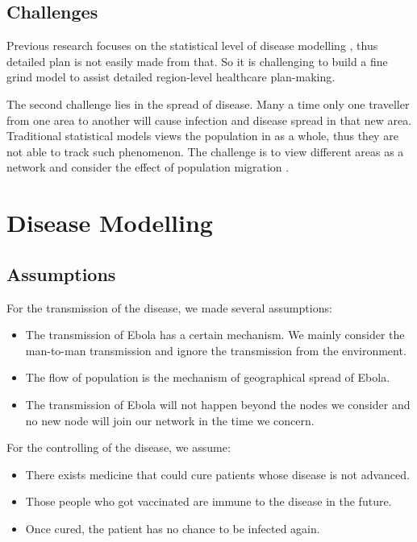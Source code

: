 \documentclass[11pt]{article}
\begin{document}
\subsection{Challenges}

Previous research focuses on the statistical level of disease modelling\cite{anderson1992infectious}\cite{lekone2006statistical}\cite{ivorra2014codis}\cite{team2014ebola}\cite{chowell2014transmission}   , thus detailed plan is not easily made from that. So it is challenging to build a fine grind model to assist detailed region-level healthcare plan-making.

The second challenge lies in the spread of disease. Many a time only one traveller from one area to another will cause infection and disease spread in that new area. Traditional statistical models views the population in as a whole, thus they are not able to track such phenomenon. The challenge is to view different areas as a network and consider the effect of population migration\cite{basharpredicting} .


\section{Disease Modelling}
\label{dmodel}
\subsection{Assumptions}

For the transmission of the disease, we made several assumptions:

\begin{itemize}

\item The transmission of Ebola has a certain mechanism. We mainly consider the man-to-man transmission and ignore the transmission from the environment.

\item The flow of population is the mechanism of geographical spread of Ebola.

\item The transmission of Ebola will not happen beyond the nodes we consider and no new node will join our network in the time we concern.

\end{itemize}

For the controlling of the disease, we assume:

\begin{itemize}

\item There exists medicine that could cure patients whose disease is not advanced. 

\item Those people who got vaccinated are immune to the disease in the future.

\item Once cured, the patient has no chance to be infected again.

\end{itemize}
\end{document}
